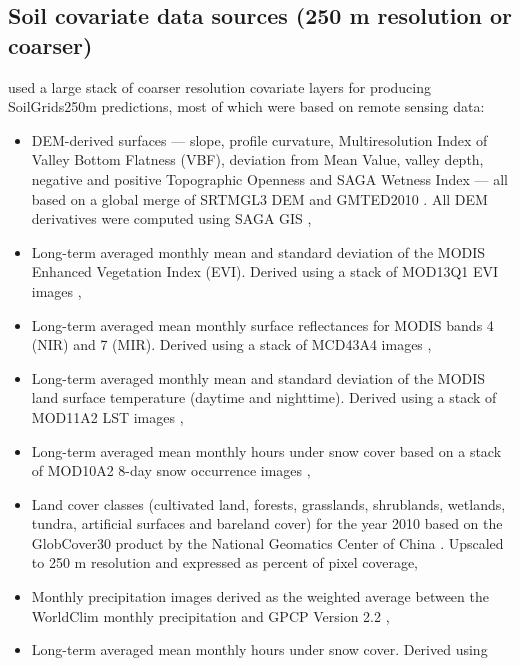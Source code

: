 \documentclass[11pt]{krantz}
\theoremstyle{definition}
\theoremstyle{definition}
\theoremstyle{definition}
\theoremstyle{remark}
\begin{document}
\hypertarget{soil-covs-250m}{%
\subsection{Soil covariate data sources (250 m resolution or
coarser)}\label{soil-covs-250m}}

\citet{Hengl2017SoilGrids250m} used a large stack of coarser resolution
covariate layers for producing SoilGrids250m predictions, most of which
were based on remote sensing data:

\begin{itemize}
\item
  DEM-derived surfaces --- slope, profile curvature, Multiresolution
  Index of Valley Bottom Flatness (VBF), deviation from Mean Value,
  valley depth, negative and positive Topographic Openness and SAGA
  Wetness Index --- all based on a global merge of SRTMGL3 DEM and
  GMTED2010 \citep{Danielson2011GMTED}. All DEM derivatives were
  computed using SAGA GIS \citep{gmd-8-1991-2015},
\item
  Long-term averaged monthly mean and standard deviation of the MODIS
  Enhanced Vegetation Index (EVI). Derived using a stack of MOD13Q1 EVI
  images \citep{Savtchenko2004ASR},
\item
  Long-term averaged mean monthly surface reflectances for MODIS bands 4
  (NIR) and 7 (MIR). Derived using a stack of MCD43A4 images
  \citep{mira2015modis},
\item
  Long-term averaged monthly mean and standard deviation of the MODIS
  land surface temperature (daytime and nighttime). Derived using a
  stack of MOD11A2 LST images \citep{wan2006modis},
\item
  Long-term averaged mean monthly hours under snow cover based on a
  stack of MOD10A2 8-day snow occurrence images
  \citep{hall2007accuracy},
\item
  Land cover classes (cultivated land, forests, grasslands, shrublands,
  wetlands, tundra, artificial surfaces and bareland cover) for the year
  2010 based on the GlobCover30 product by the National Geomatics Center
  of China \citep{Chen2014}. Upscaled to 250 m resolution and expressed
  as percent of pixel coverage,
\item
  Monthly precipitation images derived as the weighted average between
  the WorldClim monthly precipitation \citep{Hijmans2005IJC} and GPCP
  Version 2.2 \citep{huffman2009gpcp},
\item
  Long-term averaged mean monthly hours under snow cover. Derived using

\end{itemize}
\end{document}

